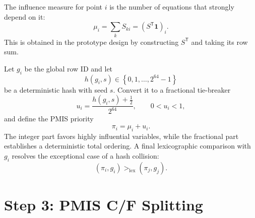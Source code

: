 \documentclass[11pt]{article}
\newcommand{\set}[1]{\left\{ #1 \right\}}
\newcommand{\trans}{^{\mathsf T}}
\begin{document}
The influence measure for point $i$ is the number of equations that strongly
depend on it:
\begin{equation}
  \mu_i
  =
  \sum_k S_{ki}
  =
  (S\trans\mathbf 1)_i.
  \label{eq:influence-measure}
\end{equation}
This is obtained in the prototype design by constructing $S\trans$ and taking
its row sum.

Let $g_i$ be the global row ID and let
\begin{equation}
  h(g_i,s)\in\set{0,1,\ldots,2^{64}-1}
  \label{eq:hash-range}
\end{equation}
be a deterministic hash with seed $s$.  Convert it to a fractional tie-breaker
\begin{equation}
  u_i
  =
  \frac{h(g_i,s)+\tfrac12}{2^{64}},
  \qquad
  0<u_i<1,
  \label{eq:priority-fraction}
\end{equation}
and define the PMIS priority
\begin{equation}
  \pi_i=\mu_i+u_i.
  \label{eq:pmis-priority}
\end{equation}
The integer part favors highly influential variables, while the fractional
part establishes a deterministic total ordering.  A final lexicographic
comparison with $g_i$ resolves the exceptional case of a hash collision:
\begin{equation}
  (\pi_i,g_i)>_{\mathrm{lex}}(\pi_j,g_j).
  \label{eq:lexicographic-priority}
\end{equation}

\section{Step 3: PMIS C/F Splitting}
\end{document}
